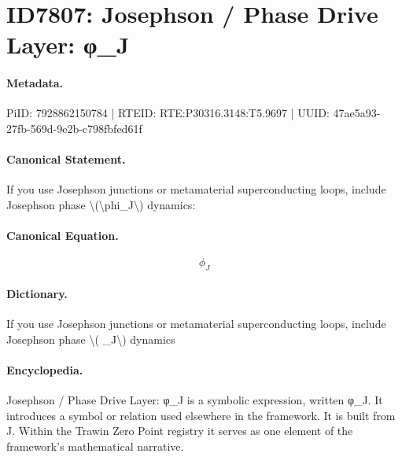 \section*{ID7807: Josephson / Phase Drive Layer: φ\_J}
\paragraph{Metadata.}
PiID: 7928862150784 | RTEID: RTE:P30316.3148:T5.9697 | UUID: 47ae5a93-27fb-569d-9e2b-c798fbfed61f

\paragraph{Canonical Statement.}
If you use Josephson junctions or metamaterial superconducting loops, include Josephson phase \textbackslash{}(\textbackslash{}phi\_J\textbackslash{}) dynamics:

\paragraph{Canonical Equation.}
\[
\phi_J
\]

\paragraph{Dictionary.}
If you use Josephson junctions or metamaterial superconducting loops, include Josephson phase \textbackslash{}( \_J\textbackslash{}) dynamics

\paragraph{Encyclopedia.}
Josephson / Phase Drive Layer: φ\_J is a symbolic expression, written φ\_J. It introduces a symbol or relation used elsewhere in the framework. It is built from J. Within the Trawin Zero Point registry it serves as one element of the framework's mathematical narrative.
